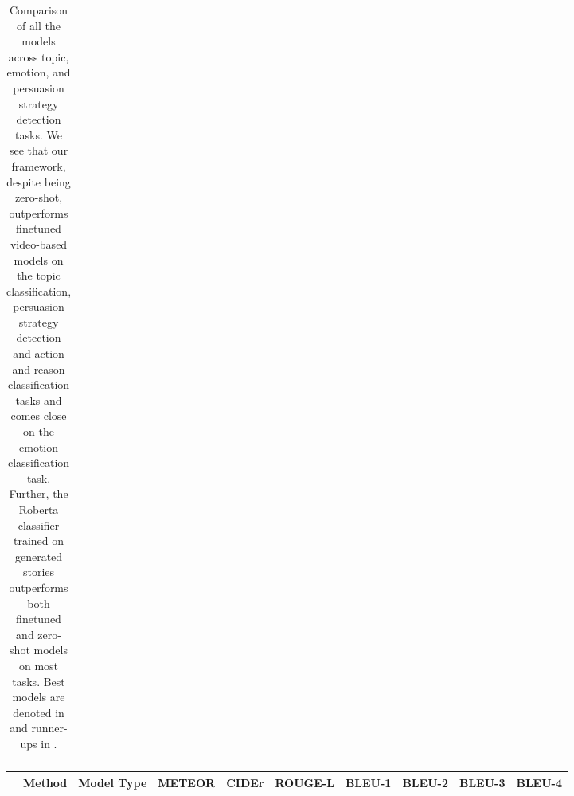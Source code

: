 \documentclass[hidelinks,11pt,a4paper]{report}
\begin{document}
\begin{table}[!h]
\begin{adjustbox}{width=\textwidth}
\begin{tabular}{llccccccc}
\bottomrule[1.5pt]
\end{tabular}
\end{adjustbox}
\caption{Comparison of all the models across topic, emotion, and persuasion strategy detection tasks. We see that our framework, despite being zero-shot, outperforms finetuned video-based models on the topic classification, persuasion strategy detection and action and reason classification tasks and comes close on the emotion classification task. Further, the Roberta classifier trained on generated stories outperforms both finetuned and zero-shot models on most tasks. Best models are denoted in  and runner-ups in .\label{tab:topic-sentiment}}
\end{table}



\begin{table}[!th]
  \centering
  \begin{adjustbox}{width=\textwidth}
  \begin{tabular}{cccccccccc}
    \toprule
    & Method & Model Type & METEOR & CIDEr & ROUGE-L & BLEU-1 & BLEU-2 & BLEU-3 & BLEU-4 \\
    \midrule
    

\end{tabular}
\end{adjustbox}
\end{table}
\end{document}
